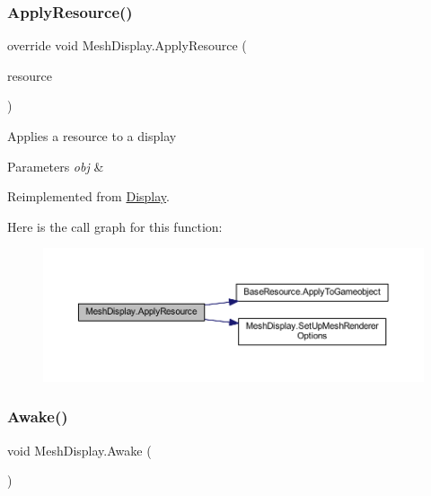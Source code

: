 \subsubsection{\texorpdfstring{Apply\+Resource()}{ApplyResource()}}
{\footnotesize\ttfamily override void Mesh\+Display.\+Apply\+Resource (\begin{DoxyParamCaption}\item[{\mbox{\hyperlink{class_base_display_resource}{Base\+Display\+Resource}}}]{resource }\end{DoxyParamCaption})\hspace{0.3cm}{\ttfamily [virtual]}}



Applies a resource to a display 


\begin{DoxyParams}{Parameters}
{\em obj} & \\
\hline
\end{DoxyParams}


Reimplemented from \mbox{\hyperlink{class_display_a811157ddb42ae4d72f690457a08711d3}{Display}}.

Here is the call graph for this function\+:
\nopagebreak
\begin{figure}[H]
\begin{center}
\leavevmode
\includegraphics[width=350pt]{class_mesh_display_ab9a24f407a8ff995658097a98242095e_cgraph}
\end{center}
\end{figure}
\mbox{\label{class_mesh_display_a13c3b8325ff12c302510a38ead46aba3}} 
\subsubsection{\texorpdfstring{Awake()}{Awake()}}
{\footnotesize\ttfamily void Mesh\+Display.\+Awake (\begin{DoxyParamCaption}{ }\end{DoxyParamCaption})\hspace{0.3cm}{\ttfamily [private]}}

